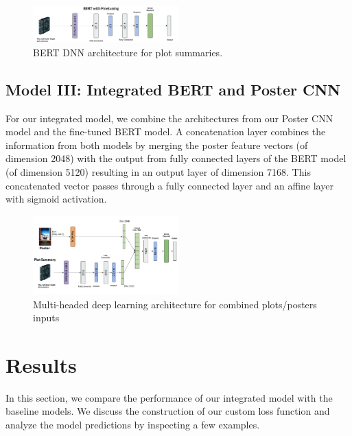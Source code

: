 \documentclass[10pt]{article}
\begin{document}
\begin{figure}[!htb]
    \centering
    \includegraphics[width=0.5\textwidth]{images/BERT-DNN.png}
    \caption{BERT DNN architecture for plot summaries.}
    \label{fig:bert}
\end{figure}

\subsection{Model III: Integrated BERT and Poster CNN}
For our integrated model, we combine the architectures from our Poster CNN model and the fine-tuned BERT model. A concatenation layer combines the information from both models by merging the poster feature vectors (of dimension 2048) with the output from fully connected layers of the BERT model (of dimension 5120) resulting in an output layer of dimension 7168. This concatenated vector passes through a fully connected layer and an affine layer with sigmoid activation.

\begin{figure}[!h]
    \centering
    \includegraphics[width=0.5\textwidth]{images/Combined.png}
    \caption{Multi-headed deep learning architecture for combined plots/posters inputs}
    \label{fig:combined_arch}
\end{figure}

\section{Results}
In this section, we compare the performance of our integrated model with the baseline models. We discuss the construction of our custom loss function and analyze the model predictions by inspecting a few examples.

\end{document}
